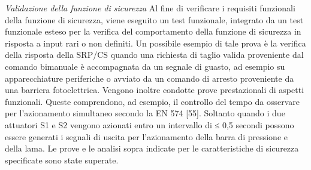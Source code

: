 \textit{Validazione della funzione di sicurezza}
Al fine di verificare i requisiti funzionali della funzione di sicurezza, viene eseguito un test funzionale, integrato da un test funzionale esteso per la verifica del comportamento della funzione di sicurezza in risposta a input rari o non definiti. Un possibile esempio di tale prova è la verifica della risposta della SRP/CS quando una richiesta di taglio valida proveniente dal comando bimanuale è accompagnata da un segnale di guasto, ad esempio su apparecchiature periferiche o avviato da un comando di arresto proveniente da una barriera fotoelettrica. Vengono inoltre condotte prove prestazionali di aspetti funzionali. Queste comprendono, ad esempio, il controllo del tempo da osservare per l'azionamento simultaneo secondo la EN 574 [55]. Soltanto quando i due attuatori S1 e S2 vengono azionati entro un intervallo di ≤ 0,5 secondi possono essere generati i segnali di uscita per l'azionamento della barra di pressione e della lama.
Le prove e le analisi sopra indicate per le caratteristiche di sicurezza specificate sono state superate.

